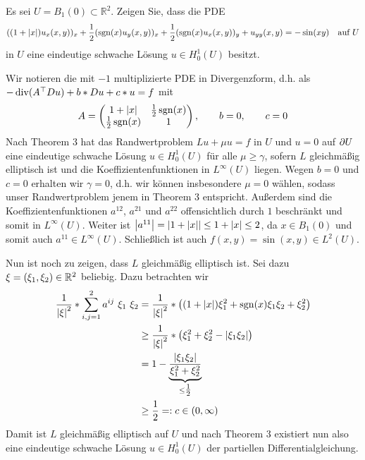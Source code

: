 \begin{exercisePage}
	
	\setcounter{taskcount}{33}
	
	\begin{task}
		Es sei $U=B_1(0)\subset \mathbb{R}^2$. Zeigen Sie, dass die PDE
		\begin{equation*}
			((1+|x|)u_{x}(x,y))_x + \frac{1}{2}(\operatorname{sgn}(x)u_{y}(x,y))_x + \frac{1}{2}(\operatorname{sgn}(x)u_x(x,y))_y + u_{yy}(x,y) = -\sin(xy) \quad \text{auf } U
		\end{equation*}
		in $U$ eine eindeutige schwache Lösung $u\in H^1_0(U)$ besitzt. 
	\end{task}

	Wir notieren die mit $-1$ multiplizierte PDE in Divergenzform, d.h. als $-\operatorname{div}(A^{\top} Du) + b * Du + c * u = f$ mit
	\begin{equation*}
		A = \begin{pmatrix}
		1 + \left| x \right| & \frac{1}{2} \operatorname{sgn}(x) \\
		\frac{1}{2} \operatorname{sgn}(x) & 1
		\end{pmatrix}, \qquad
		b = 0, \qquad
		c = 0
	\end{equation*}
	Nach Theorem 3 hat das Randwertproblem $Lu + \mu u = f$ in $U$ und $u = 0$ auf $\partial U$ eine eindeutige schwache Lösung $u \in H^1_0(U)$ für alle $\mu \ge \gamma$, sofern $L$ gleichmäßig elliptisch ist und die Koeffizientenfunktionen in $L^\infty(U)$ liegen.
	Wegen $b=0$ und $c=0$ erhalten wir $\gamma=0$, d.h. wir können insbesondere $\mu=0$ wählen, sodass unser Randwertproblem jenem in Theorem 3 entspricht. 
	Außerdem sind die Koeffizientenfunktionen $a^{12}$, $a^{21}$ und $a^{22}$ offensichtlich durch $1$ beschränkt und somit in $L^\infty(U)$. Weiter ist $\left| a^{11} \right| = \left| 1 + \left| x \right| \right| \le 1 + \left| x \right| \le 2$, da $x \in B_1(0)$ und somit auch $a^{11} \in L^\infty(U)$. Schließlich ist auch $f(x,y) = \sin(x,y) \in L^2(U)$.
	
	Nun ist noch zu zeigen, dass $L$ gleichmäßig elliptisch ist. Sei dazu $\xi = (\xi_1, \xi_2) \in \mathbb{R}^2$ beliebig.
	Dazu betrachten wir 
	\begin{align*}
		\frac{1}{\left| \xi \right|^2} * \sum_{i,j=1}^2 a^{ij} \ \xi_1 \ \xi_2
		&= \frac{1}{\left| \xi \right|^2} * \left( (1+\left| x \right|) \xi_1^2 + \operatorname{sgn}(x) \xi_1 \xi_2 + \xi_2^2 \right) \\
		&\ge \frac{1}{\left| \xi \right|^2} * \left( \xi_1^2 + \xi_2^2 - \left| \xi_1 \xi_2 \right| \right) \\
		&= 1 - \underbrace{\frac{\left| \xi_1 \xi_2 \right|}{\xi_1^2 + \xi_2^2}}_{\le \tfrac{1}{2}} \\
		&\ge \frac{1}{2} \mathrel{=:} c \in (0, \infty)
	\end{align*}
	Damit ist $L$ gleichmäßig elliptisch auf $U$ und nach Theorem 3 existiert nun also eine eindeutige schwache Lösung $u \in H^1_0(U)$ der partiellen Differentialgleichung.	
	

\end{exercisePage}
